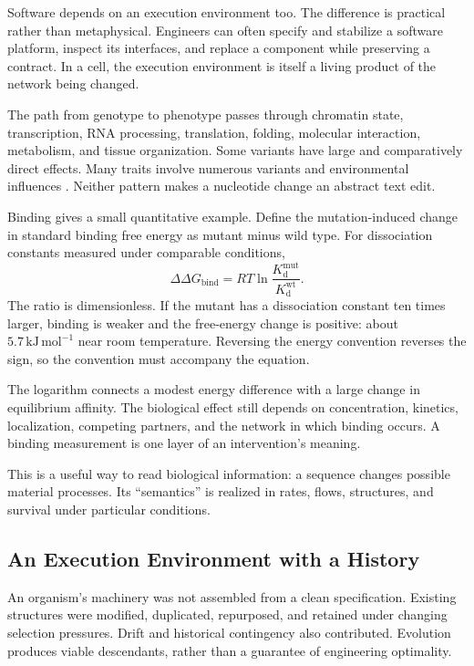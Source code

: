 \documentclass[11pt,openany]{book}
\begin{document}
Software depends on an execution environment too. The difference is practical rather than metaphysical. Engineers can often specify and stabilize a software platform, inspect its interfaces, and replace a component while preserving a contract. In a cell, the execution environment is itself a living product of the network being changed.

The path from genotype to phenotype passes through chromatin state, transcription, RNA processing, translation, folding, molecular interaction, metabolism, and tissue organization. Some variants have large and comparatively direct effects. Many traits involve numerous variants and environmental influences \cite{manolio2009finding}. Neither pattern makes a nucleotide change an abstract text edit.

Binding gives a small quantitative example. Define the mutation-induced change in standard binding free energy as mutant minus wild type. For dissociation constants measured under comparable conditions,
\begin{equation}
 \Delta\Delta G_{\mathrm{bind}}
 =RT\ln\frac{K_{\mathrm d}^{\mathrm{mut}}}
                 {K_{\mathrm d}^{\mathrm{wt}}}.
\end{equation}
The ratio is dimensionless. If the mutant has a dissociation constant ten times larger, binding is weaker and the free-energy change is positive: about $5.7\,\mathrm{kJ\,mol^{-1}}$ near room temperature. Reversing the energy convention reverses the sign, so the convention must accompany the equation.

The logarithm connects a modest energy difference with a large change in equilibrium affinity. The biological effect still depends on concentration, kinetics, localization, competing partners, and the network in which binding occurs. A binding measurement is one layer of an intervention's meaning.

This is a useful way to read biological information: a sequence changes possible material processes. Its “semantics” is realized in rates, flows, structures, and survival under particular conditions.

\subsection{An Execution Environment with a History}

An organism's machinery was not assembled from a clean specification. Existing structures were modified, duplicated, repurposed, and retained under changing selection pressures. Drift and historical contingency also contributed. Evolution produces viable descendants, rather than a guarantee of engineering optimality.
\end{document}
